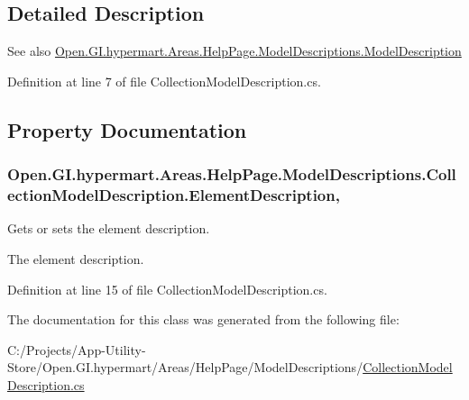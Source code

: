 \subsection{Detailed Description}


\begin{DoxySeeAlso}{See also}
\hyperlink{class_open_1_1_g_i_1_1hypermart_1_1_areas_1_1_help_page_1_1_model_descriptions_1_1_model_description}{Open.\+G\+I.\+hypermart.\+Areas.\+Help\+Page.\+Model\+Descriptions.\+Model\+Description}


\end{DoxySeeAlso}


Definition at line 7 of file Collection\+Model\+Description.\+cs.



\subsection{Property Documentation}
\hypertarget{class_open_1_1_g_i_1_1hypermart_1_1_areas_1_1_help_page_1_1_model_descriptions_1_1_collection_model_description_a4049e2a56d1af746b241c4ae2da109ca}{}
\subsubsection[{Element\+Description}]{ Open.\+G\+I.\+hypermart.\+Areas.\+Help\+Page.\+Model\+Descriptions.\+Collection\+Model\+Description.\+Element\+Description\hspace{0.3cm}{\ttfamily [get]}, {\ttfamily [set]}}\label{class_open_1_1_g_i_1_1hypermart_1_1_areas_1_1_help_page_1_1_model_descriptions_1_1_collection_model_description_a4049e2a56d1af746b241c4ae2da109ca}


Gets or sets the element description. 

The element description. 

Definition at line 15 of file Collection\+Model\+Description.\+cs.



The documentation for this class was generated from the following file\+:\begin{DoxyCompactItemize}
\item 
C\+:/\+Projects/\+App-\/\+Utility-\/\+Store/\+Open.\+G\+I.\+hypermart/\+Areas/\+Help\+Page/\+Model\+Descriptions/\hyperlink{_collection_model_description_8cs}{Collection\+Model\+Description.\+cs}\end{DoxyCompactItemize}

